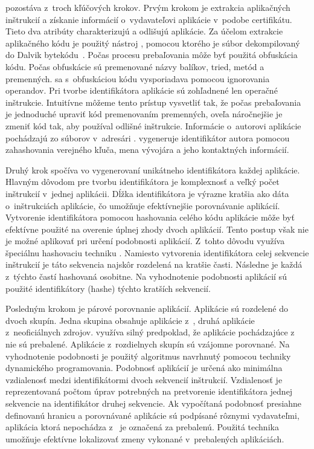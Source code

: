  pozostáva z~troch kľúčových krokov. Prvým krokom je extrakcia aplikačných inštrukcií a získanie informácií o~vydavateľovi aplikácie v~podobe certifikátu. Tieto dva atribúty charakterizujú a odlišujú aplikácie.
Za účelom extrakcie aplikačného kódu je použitý nástroj , pomocou ktorého je súbor  dekompilovaný do Dalvik bytekódu~\cite{smali}.  Počas procesu prebaľovania môže byť použitá obfuskácia kódu. Počas obfuskácie sú premenované názvy balíkov, tried, metód a premenných.  sa s~obfuskáciou kódu vysporiadava pomocou ignorovania operandov. Pri tvorbe identifikátora aplikácie sú zohľadnené len operačné inštrukcie. Intuitívne môžeme tento prístup vysvetliť tak, že počas prebaľovania je jednoduché upraviť kód premenovaním premenných, oveľa náročnejšie je zmeniť kód tak, aby používal odlišné inštrukcie. 
Informácie o~autorovi aplikácie pochádzajú zo súborov v~adresári .  vygeneruje identifikátor autora pomocou zahashovania verejného kľuča, mena vývojára a jeho kontaktných informácií. 

Druhý krok spočíva vo vygenerovaní unikátneho identifikátora každej aplikácie. Hlavným dôvodom pre tvorbu identifikátora je komplexnosť a veľký počet inštrukcií v~jednej aplikácii. Dĺžka identifikátora je výrazne kratšia ako dáta o~inštrukciách aplikácie, čo umožňuje efektívnejšie porovnávanie aplikácií. 
Vytvorenie identifikátora pomocou hashovania celého kódu aplikácie môže byť efektívne použité na overenie úplnej zhody dvoch aplikácií. Tento postup však nie je možné aplikovať pri určení podobnosti aplikácií.  Z~tohto dôvodu využíva  špeciálnu hashovaciu techniku  \cite{fuzzyHashing}. Namiesto vytvorenia identifikátora celej sekvencie inštrukcií je táto sekvencia najskôr rozdelená na kratšie časti. Následne je každá z~týchto častí hashovaná osobitne. Na vyhodnotenie podobnosti aplikácií sú použité identifikátory (hashe) týchto kratších sekvencií.

Posledným krokom je párové porovnanie aplikácií. Aplikácie sú  rozdelené do dvoch skupín. Jedna skupina obsahuje aplikácie z~, druhá aplikácie z~neoficiálnych zdrojov.   využíva silný predpoklad, že aplikácie pochádzajúce z~ nie sú prebalené. 
Aplikácie z~rozdielnych skupín sú vzájomne porovnané. Na vyhodnotenie podobnosti je použitý algoritmus navrhnutý pomocou techniky dynamického programovania. Podobnosť aplikácií je určená ako minimálna vzdialenosť medzi identifikátormi dvoch sekvencií inštrukcií.  Vzdialenosť je reprezentovaná počtom úprav potrebných na pretvorenie identifikátora jednej sekvencie na identifikátor druhej sekvencie. Ak vypočítaná podobnosť presiahne definovanú hranicu a porovnávané aplikácie sú podpísané rôznymi vydavateľmi, aplikácia ktorá nepochádza z~ je označená za prebalenú. Použitá technika umožňuje efektívne lokalizovať zmeny vykonané v~prebalených aplikáciách. 

